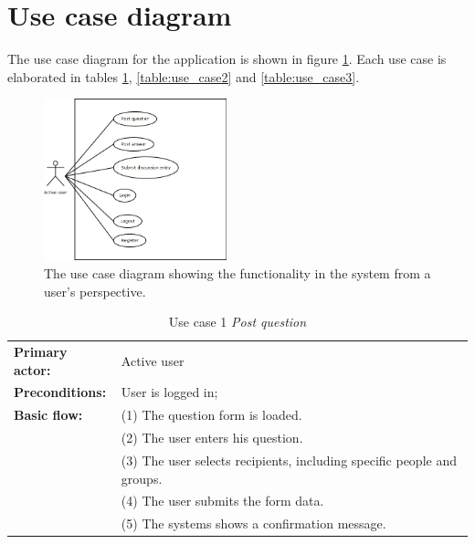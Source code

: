 

\section{Use case diagram}\label{section:usecase}

The use case diagram for the application is shown in  figure \ref{figure:use_case_diagram}. Each use case is elaborated in tables \ref{table:use_case1}, \ref{table:use_case2} and \ref{table:use_case3}.

\begin{figure}
	\begin{center}
		\includegraphics[width=200px]{img/use_case_diagram}
	\end{center}
	\caption{The use case diagram showing the functionality in the system from a user's perspective.}
	\label{figure:use_case_diagram}
\end{figure}


\begin{table}[h]
\caption{Use case 1 \textit{Post question}}
\begin{center}
	\begin{tabular}{ l p{300px} }
		\hline
		\textbf{Primary actor:}	& Active user \\

		\textbf{Preconditions:}	& User is logged in; \\

		\textbf{Basic flow:}	& (1) The question form is loaded. \\
													& (2) The user enters his question. \\
													& (3) The user selects recipients, including specific people and groups. \\
													& (4) The user submits the form data. \\
													& (5) The systems shows a confirmation message. \\

		\hline
	\end{tabular}
\end{center}
\label{table:use_case1}
\end{table}


